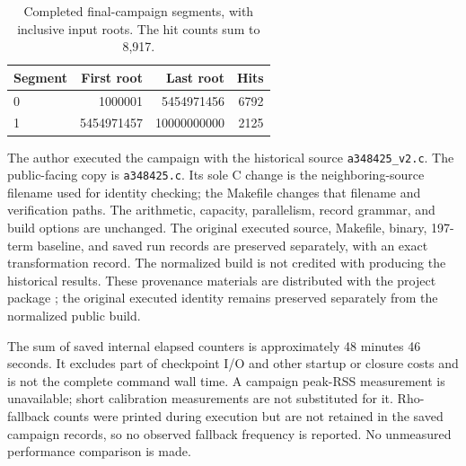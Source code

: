 \documentclass[11pt]{article}
\theoremstyle{definition}
\theoremstyle{remark}
\begin{document}
\begin{table}[htbp]
\centering
\caption{Completed final-campaign segments, with inclusive input roots.
The hit counts sum to 8,917.}\label{tab:segments}
\begin{tabular}{lrrr}
\toprule
Segment&First root&Last root&Hits\\
\midrule
0&1000001&5454971456&6792\\
1&5454971457&10000000000&2125\\
\bottomrule
\end{tabular}
\end{table}

The author executed the campaign with the historical source
\texttt{a348425\_v2.c}. The public-facing copy is
\texttt{a348425.c}. Its sole C change is the neighboring-source filename
used for identity checking; the Makefile changes that filename and
verification paths. The arithmetic, capacity, parallelism, record grammar,
and build options are unchanged. The original executed source, Makefile,
binary, 197-term baseline, and saved run records are preserved separately,
with an exact transformation record. The normalized build is not credited
with producing the historical results. These provenance materials are distributed with the project
package \cite{project}; the original executed identity remains preserved
separately from the normalized public build.

The sum of saved internal elapsed counters is approximately 48 minutes
46 seconds. It excludes part of checkpoint I/O and other startup or
closure costs and is not the complete command wall time. A campaign
peak-RSS measurement is unavailable; short calibration measurements
are not substituted for it. Rho-fallback counts were printed during
execution but are not retained in the saved campaign records, so
no observed fallback frequency is reported. No unmeasured performance
comparison is made.
\end{document}
